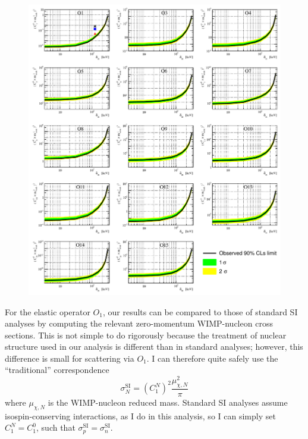 \begin{figure}
\begin{minipage}{1.\linewidth}
\centerline{\includegraphics[width=\textwidth,height=0.99\textheight,keepaspectratio]{fig/FinalInelastic.pdf}}
\end{minipage}
\label{fig:InelasticLimit}
\end{figure}

For the elastic operator $O_1$, our results can be compared to those of standard SI analyses by computing the relevant zero-momentum WIMP-nucleon cross sections. This is not simple to do rigorously because the treatment of nuclear structure used in our analysis is different than in standard analyses; however, this difference is small for scattering via $O_1$. I can therefore quite safely use the ``traditional'' correspondence~\cite{DeSimone:2016fbz}
%
\begin{equation}
\sigma_{N}^\mathrm{SI} = \left(C^N_1\right)^2 \frac{\mu_{\chi,N}^2}{\pi}
\end{equation}
%
where $\mu_{\chi,N}$ is the WIMP-nucleon reduced mass. Standard SI analyses assume isospin-conserving interactions, as I do in this analysis, so I can simply set $C^N_1 = C^0_1$, such that $\sigma_{p}^\mathrm{SI}=\sigma_{n}^\mathrm{SI}$. 

